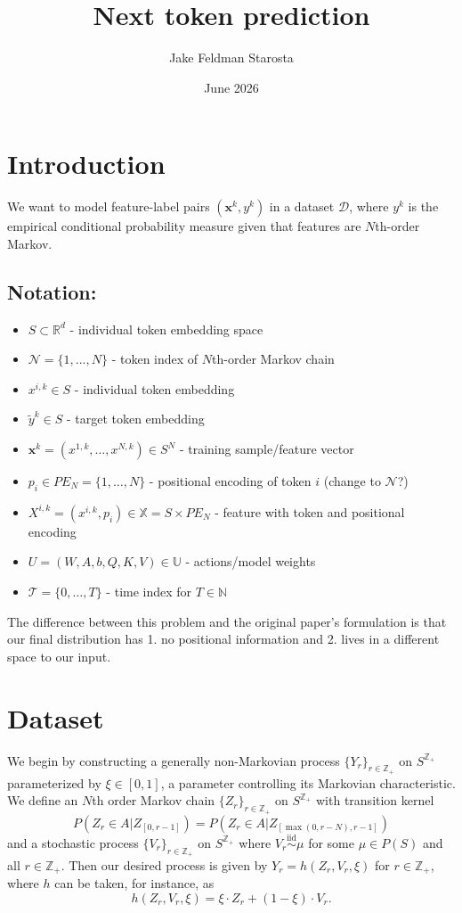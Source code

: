 \documentclass{article}
\title{Next token prediction}
\author{Jake Feldman Starosta}
\date{June 2026}
\begin{document}
\maketitle

\section{Introduction}
We want to model feature-label pairs $(\bm{x}^k, y^k)$ in a dataset $\mathcal{D}$, where $y^k$ is the empirical conditional probability measure given that features are $N$th-order Markov. 

\subsection{Notation:}
\begin{itemize}
\item $S \subset \mathbb{R}^d$ - individual token embedding space 
\item $\mathcal{N} = \{1, ..., N\} $ - token index of $N$th-order Markov chain
\item $x^{i,k} \in S$ - individual token embedding
\item $\tilde y^k \in S$ - target token embedding
\item $\bm{x}^k = (x^{1, k}, \dots, x^{N, k}) \in S^N$ - training sample/feature vector
\item $p_i \in PE_N = \{1, \dots, N\}$ - positional encoding of token $i$ (change to $\mathcal{N}$?)
\item $X^{i,k} = (x^{i, k} , p_i) \in \mathbb{X} = S\times PE_N$ - feature with token and  positional encoding
\item $U = (W, A, b, Q, K, V) \in \mathbb{U}$ - actions/model weights
\item $\mathcal{T} = \{0, \dots, T\}$ - time index for $T \in \mathbb N$


\end{itemize}

The difference between this problem and the original paper's \cite{akman2026optimal} formulation is that our final distribution has 1. no positional information and 2. lives in a different space to our input. 


\section{Dataset}

We begin by constructing a generally non-Markovian process $\{Y_r\}_{r \in \mathbb{Z_+}}$ on $S^\mathbb{Z_+}$ parameterized by $\xi \in [0,1]$, a parameter controlling its Markovian characteristic. We define an $N$th order Markov chain $\{Z_r\}_{r \in \mathbb{Z_+}}$ on $S^\mathbb{Z_+}$ with transition kernel 
$$P(Z_r\in A|Z_{[0, r-1]}) = P(Z_r\in A|Z_{[\max(0, r-N), r-1]})$$
and a stochastic process $\{V_r\}_{r \in \mathbb{Z_+}}$ on $S^\mathbb{Z_+}$
where $V_r \overset{\text{iid}}\sim \mu$ for some $\mu \in P(S)$ and all $r \in \mathbb Z _+$. Then our desired process is given by $Y_r = h(Z_r, V_r, \xi)$ for $r \in \mathbb Z _+$, where $h$ can be taken, for instance, as
$$h(Z_r, V_r, \xi) = \xi \cdot Z_r + (1-\xi) \cdot V_r.$$
\end{document}
